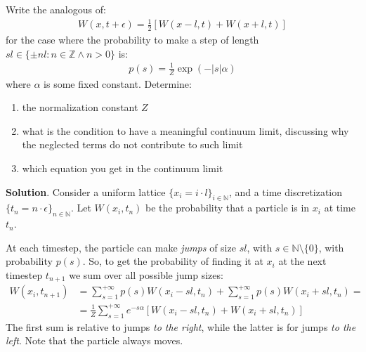 \documentclass[../template.tex]{subfiles}
\begin{document}
\begin{exo}
    Write the analogous of:
    \begin{align*}
        W(x,t+\epsilon) = \frac{1}{2}[W(x-l,t) + W(x+l,t)] 
    \end{align*}
    for the case where the probability to make a step of length $sl \in \{\pm nl \colon n \in \mathbb{Z} \land n > 0\}$ is:
    \begin{align*}
        p(s) = \frac{1}{Z} \exp\left(-|s| \alpha\right) 
    \end{align*}
    where $\alpha$ is some fixed constant. Determine:
    \begin{enumerate}
        \item the normalization constant $Z$
        \item what is the condition to have a meaningful continuum limit, discussing why the neglected terms do not contribute to such limit
        \item which equation you get in the continuum limit 
    \end{enumerate}

    \medskip

    \textbf{Solution}. Consider a uniform lattice $\{x_i = i \cdot l\}_{i \in \mathbb{N}}$, and a time discretization $\{t_n = n \cdot \epsilon\}_{n \in \mathbb{N}}$. Let $W(x_i, t_n)$ be the probability that a particle is in $x_i$ at time $t_n$.

    At each timestep, the particle can make \textit{jumps} of size $sl$, with $s \in \mathbb{N} \setminus \{0\}$, with probability $p(s)$. So, to get the probability of finding it at $x_i$ at the next timestep $t_{n+1}$ we sum over all possible jump sizes:
    \begin{align} \nonumber
        W(x_i, t_{n+1}) &= \sum_{s=1}^{+\infty} p(s) W(x_i-sl, t_n) + \sum_{s=1}^{+\infty} p(s) W(x_i+sl,t_n) =\\
        &= \frac{1}{Z} \sum_{s=1}^{+\infty} e^{-s \alpha} \left[ W(x_i-sl, t_n) +  W(x_i+sl,t_n) \right] \label{eqn:ME-multiple}
    \end{align} 
    The first sum is relative to jumps \textit{to the right}, while the latter is for jumps \textit{to the left}. Note that the particle always moves.


\end{exo}
\end{document}

